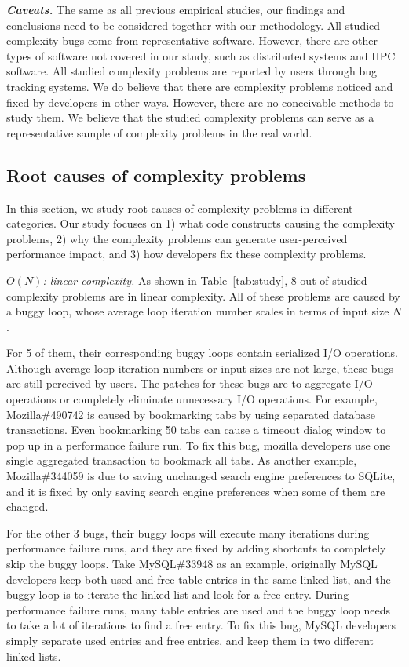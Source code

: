 {\bf{\textit{Caveats.}}}
The same as all previous empirical studies, 
our findings and conclusions need to be considered together with our methodology.
All studied complexity bugs come from representative software. 
However, there are other types of software not covered in our study, 
such as distributed systems and HPC software. 
All studied complexity problems are reported by users through bug tracking systems.  
We do believe that there are complexity problems noticed 
and fixed by developers in other ways. 
However, there are no conceivable methods to study them.
We believe that the studied complexity problems can serve as a representative sample
of complexity problems in the real world. 


\subsection{Root causes of complexity problems}
\label{sec:tax}



In this section, we study root causes of complexity problems in different categories. 
Our study focuses on 
1) what code constructs causing the complexity problems, 
2) why the complexity problems can generate user-perceived performance impact, 
and 3) how developers fix these complexity problems. 


{\underline{\textit{$O(N)$: linear complexity.}}} 
As shown in Table~\ref{tab:study}, 
8 out of \ComBugs studied complexity problems are in linear complexity. 
All of these problems are caused by a buggy loop, 
whose average loop iteration number scales in terms of input size $N$.

For 5 of them, their corresponding buggy loops contain serialized I/O operations.
Although average loop iteration numbers or input sizes are not large,
these bugs are still perceived by users.
The patches for these bugs are to aggregate I/O operations 
or completely eliminate unnecessary I/O operations.   
For example, Mozilla\#490742 is caused by bookmarking tabs 
by using separated database transactions. 
Even bookmarking 50 tabs can cause a timeout dialog window to pop up 
in a performance failure run.
To fix this bug, mozilla developers use one single aggregated transaction 
to bookmark all tabs.
As another example, Mozilla\#344059 is due to saving unchanged 
search engine preferences to SQLite, 
and it is fixed by only saving search 
engine preferences when some of them are changed.

For the other 3 bugs, their buggy loops will execute many iterations 
during performance failure runs,
and they are fixed by adding shortcuts to completely skip the buggy loops.
Take MySQL\#33948 as an example, 
originally MySQL developers keep both used and free table entries in the same linked list,
and the buggy loop is to iterate the linked list and look for a free entry.
During performance failure runs, many table entries are used and the buggy loop 
needs to take a lot of iterations to find a free entry. 
To fix this bug, MySQL developers simply separate used entries 
and free entries, and keep them in two different linked lists. 

